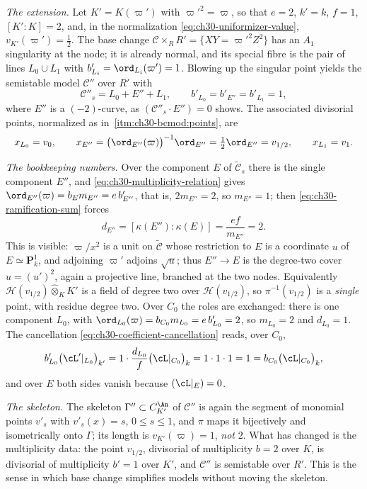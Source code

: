 \begin{example}
\emph{The extension.}  Let \(K'=K(\varpi')\) with \(\varpi'^2=\varpi\), so
that \(e=2\), \(k'=k\), \(f=1\), \([K':K]=2\), and, in the normalization
\eqref{eq:ch30-uniformizer-value}, \(v_{K'}(\varpi')=\tfrac12\).  The base
change \(\mathcal C\times_RR'=\{XY=\varpi'^2Z^2\}\) has an \(A_1\) singularity at
the node; it is already normal, and its special fibre is the pair of lines
\(L_0\cup L_1\) with \(b'_{L_i}=\ord_{L_i}(\varpi')=1\).  Blowing up the
singular point yields the semistable model \(\mathcal C''\) over \(R'\) with
\[
 \mathcal C''_s=L_0+E''+L_1,
 \qquad b'_{L_0}=b'_{E''}=b'_{L_1}=1,
\]
where \(E''\) is a \((-2)\)-curve, as \((\mathcal C''_s\cdot E'')=0\) shows.  The
associated divisorial points, normalized as in
\,\cref{itm:ch30-bcmod:points}, are
\[
 x_{L_0}=v_0,\qquad
 x_{E''}=\bigl(\ord_{E''}(\varpi)\bigr)^{-1}\ord_{E''}
        =\tfrac12\ord_{E''}=v_{1/2},\qquad
 x_{L_1}=v_1 .
\]

\emph{The bookkeeping numbers.}  Over the component \(E\) of
\(\widetilde{\mathcal C}_s\) there is the single component \(E''\), and
\eqref{eq:ch30-multiplicity-relation} gives
\(\ord_{E''}(\varpi)=b_Em_{E''}=e\,b'_{E''}\), that is,
\(2m_{E''}=2\), so \(m_{E''}=1\); then
\eqref{eq:ch30-ramification-sum} forces
\[
 d_{E''}=[\kappa(E''):\kappa(E)]=\frac{ef}{m_{E''}}=2 .
\]
This is visible: \(\varpi/x^2\) is a unit on \(\widetilde{\mathcal C}\) whose
restriction to \(E\) is a coordinate \(u\) of \(E\simeq\mathbf P^1_k\), and
adjoining \(\varpi'\) adjoins \(\sqrt u\); thus \(E''\to E\) is the
degree-two cover \(u=(u')^2\), again a projective line, branched at the two
nodes.  Equivalently \(\mathcal H(v_{1/2})\widehat\otimes_KK'\) is a field
of degree two over \(\mathcal H(v_{1/2})\), so
\(\pi^{-1}(v_{1/2})\) is a \emph{single} point, with residue degree two.
Over \(C_0\) the roles are exchanged: there is one component \(L_0\), with
\(\ord_{L_0}(\varpi)=b_{C_0}m_{L_0}=e\,b'_{L_0}=2\), so \(m_{L_0}=2\) and
\(d_{L_0}=1\).  The cancellation
\eqref{eq:ch30-coefficient-cancellation} reads, over \(C_0\),
\[
 b'_{L_0}\bigl(\cL'|_{L_0}\bigr)_{k'}
 =1\cdot\frac{d_{L_0}}{f}\bigl(\cL|_{C_0}\bigr)_k
 =1\cdot1\cdot1=1=b_{C_0}\bigl(\cL|_{C_0}\bigr)_k ,
\]
and over \(E\) both sides vanish because \((\cL|_E)=0\).

\emph{The skeleton.}  The skeleton \(\Gamma''\subset C_{K'}^{\An}\) of
\(\mathcal C''\) is again the segment of monomial points \(v'_s\) with
\(v'_s(x)=s\), \(0\leq s\leq1\), and \(\pi\) maps it bijectively and
isometrically onto \(\Gamma\); its length is \(v_{K'}(\varpi)=1\),
\emph{not} \(2\).  What has changed is the multiplicity data: the point
\(v_{1/2}\), divisorial of multiplicity \(b=2\) over \(K\), is divisorial of
multiplicity \(b'=1\) over \(K'\), and \(\mathcal C''\) is semistable over \(R'\).
This is the sense in which base change simplifies models without moving the
skeleton.


\end{example}
